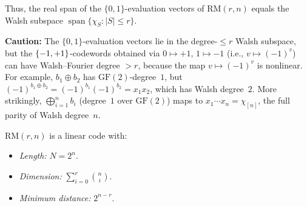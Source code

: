 Thus, the real span of the $\{0,1\}$-evaluation vectors of
$\text{RM}(r,n)$ equals the Walsh subspace
$\operatorname{span}\{\chi_S : |S| \leq r\}$.

\textbf{Caution:} The $\{0,1\}$-evaluation vectors lie in the
degree-$\leq r$ Walsh subspace, but the $\{-1,+1\}$-codewords obtained via
$0 \mapsto +1$, $1 \mapsto -1$ (i.e., $v \mapsto (-1)^v$) can have
Walsh--Fourier degree $> r$, because the map $v \mapsto (-1)^v$ is
nonlinear. For example, $b_1 \oplus b_2$ has $\text{GF}(2)$-degree~$1$,
but $(-1)^{b_1 \oplus b_2} = (-1)^{b_1}(-1)^{b_2} = x_1 x_2$, which
has Walsh degree~$2$. More strikingly, $\bigoplus_{i=1}^n b_i$
(degree~$1$ over $\text{GF}(2)$) maps to $x_1 \cdots x_n = \chi_{[n]}$,
the full parity of Walsh degree~$n$.

\begin{theorem}\label{thm:rm-params}
$\text{RM}(r, n)$ is a linear code with:
\begin{itemize}
  \item \emph{Length:} $N = 2^n$.
  \item \emph{Dimension:} $\sum_{i=0}^r \binom{n}{i}$.
  \item \emph{Minimum distance:} $2^{n-r}$.
\end{itemize}
\end{theorem}

